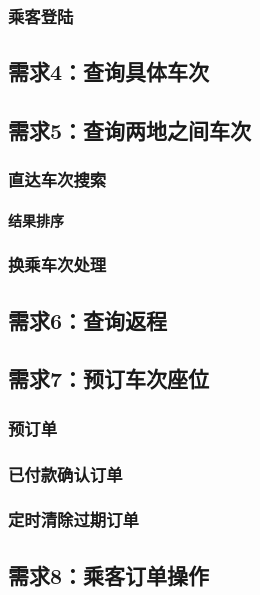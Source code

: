 \documentclass[UTF-8,twoside,c5size]{ctexart}
\def\hfparagraph#1{\paragraph{#1} \hfill}
\begin{document}
	\subsubsection{乘客登陆}
	
	\subsection{需求4：查询具体车次}
	
	\subsection{需求5：查询两地之间车次}
	
	\subsubsection{直达车次搜索}
	
	\hfparagraph{结果排序}
	
	\subsubsection{换乘车次处理}
	
	\subsection{需求6：查询返程}
	

	\subsection{需求7：预订车次座位}
	
	\subsubsection{预订单}

	\subsubsection{已付款确认订单}
	
	\subsubsection{定时清除过期订单}
	
	\subsection{需求8：乘客订单操作}
	
\end{document}
